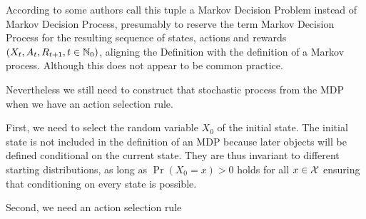 According to \textcite{putermanMarkovDecisionProcesses2005} some authors call this tuple a Markov Decision Problem instead of Markov Decision Process, presumably to reserve the term Markov Decision Process for the resulting sequence of states, actions and rewards \((X_t,A_t,R_{t+1},t\in\mathbb{N}_0)\), aligning the Definition with the definition of a Markov process. Although this does not appear to be common practice.

Nevertheless we still need to construct that stochastic process from the MDP when we have an action selection rule. 

First, we need to select the random variable \(X_0\) of the initial state. The initial state is not included in the definition of an MDP because later objects will be defined conditional on the current state. They are thus invariant to different starting distributions, as long as \(\Pr(X_0=x)>0\) holds for all \(x\in\mathcal{X}\) ensuring that conditioning on every state is possible.

Second, we need an action selection rule

